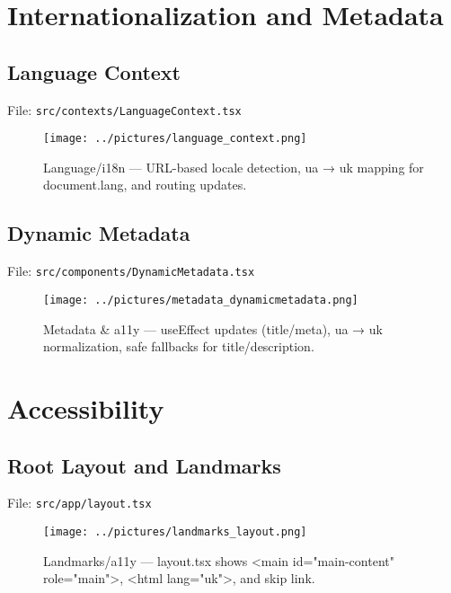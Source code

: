 \documentclass[11pt,a4paper]{article}
\begin{document}


\section{Internationalization and Metadata}
\subsection*{Language Context}
\noindent File: \texttt{src/contexts/LanguageContext.tsx}

\begin{figure}[h!]
  \centering
  \texttt{[image: ../pictures/language\_context.png]}
  \caption{Language/i18n — URL-based locale detection, ua → uk mapping for document.lang, and routing updates.}
\end{figure}



\subsection*{Dynamic Metadata}
\noindent File: \texttt{src/components/DynamicMetadata.tsx}

\begin{figure}[h!]
  \centering
  \texttt{[image: ../pictures/metadata\_dynamicmetadata.png]}
  \caption{Metadata \& a11y — useEffect updates (title/meta), ua → uk normalization, safe fallbacks for title/description.}
\end{figure}



\section{Accessibility}
\subsection*{Root Layout and Landmarks}
\noindent File: \texttt{src/app/layout.tsx}

\begin{figure}[h!]
  \centering
  \texttt{[image: ../pictures/landmarks\_layout.png]}
  \caption{Landmarks/a11y — layout.tsx shows <main id="main-content" role="main">, <html lang="uk">, and skip link.}
\end{figure}
\end{document}
